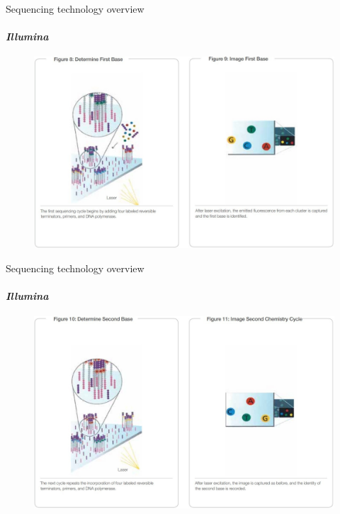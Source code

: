 \documentclass{if-beamer}
\begin{document}
\begin{frame}{Sequencing technology overview}
\framesubtitle{\emph{Illumina}}
\begin{figure}
\centering
\includegraphics[scale=0.2]{illumina4.jpg}
\end{figure}
\end{frame}
\begin{frame}{Sequencing technology overview}
\framesubtitle{\emph{Illumina}}
\begin{figure}
\centering
\includegraphics[scale=0.2]{illumina5.jpg}
\end{figure}
\end{frame}
\end{document}
